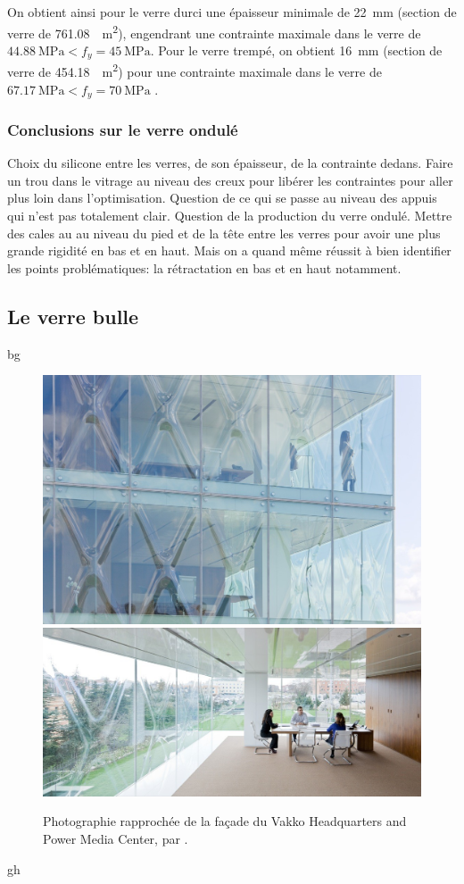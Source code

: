\documentclass[11pt,titlepage]{article}
\begin{document}
On obtient ainsi pour le verre durci une épaisseur minimale de \qty{22}{\milli\meter} (section de verre de \qty{761.08}{\centi\square\meter}), engendrant une contrainte maximale dans le verre de $\qty{44.88}{\mega\pascal} < f_y = \qty{45}{\mega\pascal}$. Pour le verre trempé, on obtient \qty{16}{\milli\meter} (section de verre de \qty{454.18}{\centi\square\meter}) pour une contrainte maximale dans le verre de $\qty{67.17}{\mega\pascal} < f_y = \qty{70}{\mega\pascal}$ .

\subsubsection{Conclusions sur le verre ondulé}

Choix du silicone entre les verres, de son épaisseur, de la contrainte dedans. Faire un trou dans le vitrage au niveau des creux pour libérer les contraintes pour aller plus loin dans l'optimisation. Question de ce qui se passe au niveau des appuis qui n'est pas totalement clair. Question de la production du verre ondulé. Mettre des cales au au niveau du pied et de la tête entre les verres pour avoir une plus grande rigidité en bas et en haut. Mais on a quand même réussit à bien identifier les points problématiques: la rétractation en bas et en haut notamment.

\subsection{Le verre bulle}
bg
\begin{figure}[H]
    \centering
    \includegraphics[width=\linewidth]{img/bulle/Vakko_ext.jpg}
    \includegraphics[width=\linewidth]{img/bulle/Vakko_int.jpg}
    \caption{Photographie rapprochée de la façade du Vakko Headquarters and Power Media Center, par \cite{VekkoHQ}.}
    \label{fig:VakkoHQ}
\end{figure}
gh
\end{document}

